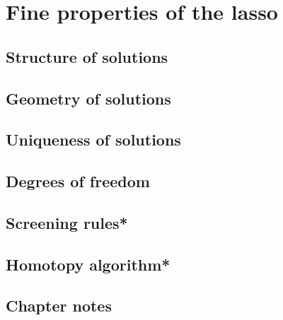 \chapter{Fine properties of the lasso}
\label{chap:lasso}

\section{Structure of solutions}
\label{sec:lasso_structure}


\section{Geometry of solutions}


\section{Uniqueness of solutions}

\section{Degrees of freedom}

\section{Screening rules*}

\section{Homotopy algorithm*}

\SkipTocEntry\section*{Chapter notes}


